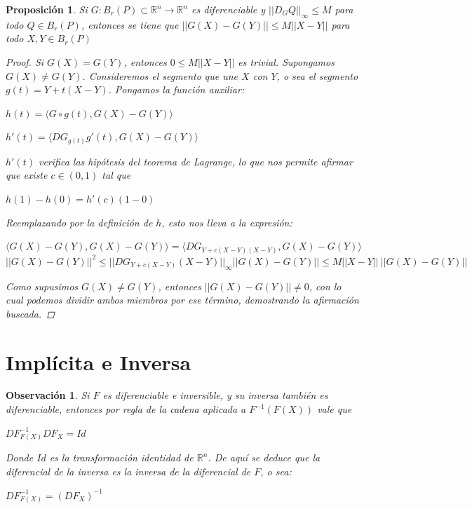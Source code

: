 \documentclass[]{article}
\newtheorem{prop}[teo]{Proposición}
\newtheorem{obs}[teo]{Observación}
\def\R{\mathbb{R}}
\newcommand{\ip}[2]{\langle #1,#2 \rangle}
\begin{document}
\begin{prop}
	Si $G:B_r(P) \subset \R^n \to \R^n$ es diferenciable y $||D_GQ||_{\infty} \leq M$ para todo $Q\in B_r(P)$, entonces se tiene que $||G(X)-G(Y)|| \leq M||X-Y||$ para todo $X,Y\in B_r(P)$
	\begin{proof}
		Si $G(X)=G(Y)$, entonces $0 \leq M||X-Y||$ es trivial. Supongamos $G(X)\neq G(Y)$. Consideremos el segmento que une $X$ con $Y$, o sea el segmento $g(t)=Y+t(X-Y)$. Pongamos la función auxiliar:
		\begin{center}
			$h(t) = \ip{G\circ g(t)}{G(X)-G(Y)}$
		\end{center}
		\begin{center}
			$h'(t) = \ip{DG_{g(t)}g'(t)}{G(X)-G(Y)}$
		\end{center}
		$h'(t)$ verifica las hipótesis del teorema de Lagrange, lo que nos permite afirmar que existe $c\in (0,1)$ tal que 
		\begin{center}
			$h(1)-h(0) = h'(c)(1-0)$
		\end{center}
		Reemplazando por la definición de $h$, esto nos lleva a la expresión:
		\begin{center}
			$\ip{G(X)-G(Y)}{G(X)-G(Y)} = \ip{DG_{Y+c(X-Y)(X-Y)}}{G(X)-G(Y)}$
			$||G(X)-G(Y)||^2 \leq ||DG_{Y+c(X-Y)}(X-Y)||_{\infty}||G(X)-G(Y)|| \leq M||X-Y||\ ||G(X)-G(Y)||$
		\end{center} 
		Como supusimos $G(X)\neq G(Y)$, entonces $||G(X)-G(Y)||\neq 0$, con lo cual podemos dividir ambos miembros por ese término, demostrando la afirmación buscada.
	\end{proof}
\end{prop}

\newpage
\section{Implícita e Inversa}
\begin{obs}
	Si $F$ es diferenciable e inversible, y su inversa también es diferenciable, entonces por regla de la cadena aplicada a $F^{-1}(F(X))$ vale que
	\begin{center}
		$DF^{-1}_{F(X)}DF_X=Id$
	\end{center}
	Donde $Id$ es la transformación identidad de $\R^n$. De aquí se deduce que la diferencial de la inversa es la inversa de la diferencial de $F$, o sea:
	\begin{center}
		$DF^{-1}_{F(X)} = (DF_X)^{-1}$
	\end{center}
\end{obs}
\end{document}
